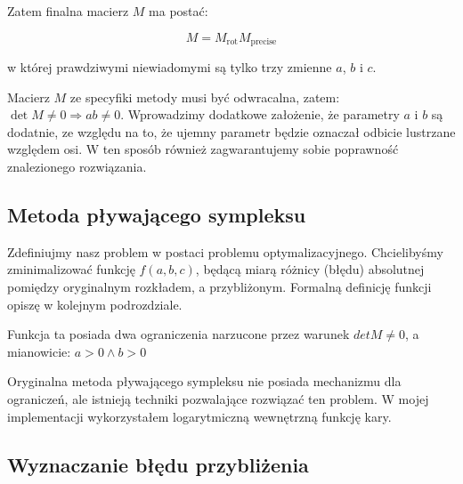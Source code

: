 \documentclass[../main.tex]{subfiles}
\begin{document}
Zatem finalna macierz $M$ ma postać:

$$
M = M_{\text{rot}} M_{\text{precise}}
$$

w której prawdziwymi niewiadomymi są tylko trzy zmienne $a$, $b$ i $c$.

Macierz $M$ ze specyfiki metody musi być odwracalna, zatem:
  $\det M \neq 0 \Rightarrow ab \neq 0$.
Wprowadzimy dodatkowe założenie, że parametry $a$ i $b$ są dodatnie, ze względu
na to, że ujemny parametr będzie oznaczał odbicie lustrzane względem osi.
W ten sposób również zagwarantujemy sobie poprawność znalezionego rozwiązania.

\subsection{Metoda pływającego sympleksu}

Zdefiniujmy nasz problem w postaci problemu optymalizacyjnego. Chcielibyśmy
zminimalizować funkcję $f(a,b,c)$, będącą miarą różnicy (błędu) absolutnej
pomiędzy oryginalnym rozkładem, a przybliżonym. Formalną definicję funkcji
opiszę w kolejnym podrozdziale.

Funkcja ta posiada dwa ograniczenia narzucone przez warunek $detM \neq 0$,
a mianowicie:
  $a > 0 \wedge b > 0$

Oryginalna metoda pływającego sympleksu nie posiada mechanizmu dla ograniczeń,
ale istnieją techniki pozwalające rozwiązać ten problem. W mojej implementacji
wykorzystałem logarytmiczną wewnętrzną funkcję kary.




\subsection{Wyznaczanie błędu przybliżenia}

\end{document}
